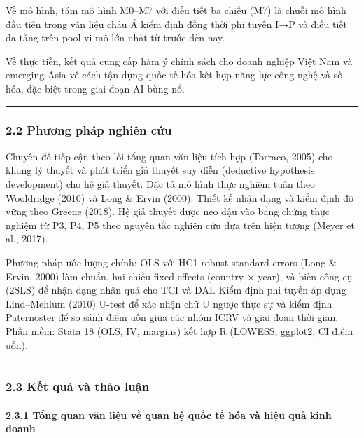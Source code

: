 \documentclass[12pt,a4paper]{article}
\begin{document}
Về mô hình, tám mô hình M0--M7 với điều tiết ba chiều (M7) là chuỗi mô
hình đầu tiên trong văn liệu châu Á kiểm định đồng thời phi tuyến I→P và
điều tiết đa tầng trên pool vi mô lớn nhất từ trước đến nay.

Về thực tiễn, kết quả cung cấp hàm ý chính sách cho doanh nghiệp Việt
Nam và emerging Asia về cách tận dụng quốc tế hóa kết hợp năng lực công
nghệ và số hóa, đặc biệt trong giai đoạn AI bùng nổ.

\begin{center}\rule{0.5\linewidth}{0.5pt}\end{center}

\hypertarget{22-phux1b0ux1a1ng-phuxe1p-nghiuxean-cux1ee9u}{%
\subsubsection{2.2 Phương pháp nghiên
cứu}\label{22-phux1b0ux1a1ng-phuxe1p-nghiuxean-cux1ee9u}}

Chuyên đề tiếp cận theo lối tổng quan văn liệu tích hợp (Torraco, 2005)
cho khung lý thuyết và phát triển giả thuyết suy diễn (deductive
hypothesis development) cho hệ giả thuyết. Đặc tả mô hình thực nghiệm
tuân theo Wooldridge (2010) và Long \& Ervin (2000). Thiết kế nhận dạng
và kiểm định độ vững theo Greene (2018). Hệ giả thuyết được neo đậu vào
bằng chứng thực nghiệm từ P3, P4, P5 theo nguyên tắc nghiên cứu dựa trên
hiện tượng (Meyer et al., 2017).

Phương pháp ước lượng chính: OLS với HC1 robust standard errors (Long \&
Ervin, 2000) làm chuẩn, hai chiều fixed effects (country × year), và
biến công cụ (2SLS) để nhận dạng nhân quả cho TCI và DAI. Kiểm định phi
tuyến áp dụng Lind--Mehlum (2010) U-test để xác nhận chữ U ngược thực sự
và kiểm định Paternoster để so sánh điểm uốn giữa các nhóm ICRV và giai
đoạn thời gian. Phần mềm: Stata 18 (OLS, IV, margins) kết hợp R (LOWESS,
ggplot2, CI điểm uốn).

\begin{center}\rule{0.5\linewidth}{0.5pt}\end{center}

\hypertarget{23-kux1ebft-quux1ea3-vuxe0-thux1ea3o-luux1eadn}{%
\subsubsection{2.3 Kết quả và thảo
luận}\label{23-kux1ebft-quux1ea3-vuxe0-thux1ea3o-luux1eadn}}

\hypertarget{231-tux1ed5ng-quan-vux103n-liux1ec7u-vux1ec1-quan-hux1ec7-quux1ed1c-tux1ebf-huxf3a-vuxe0-hiux1ec7u-quux1ea3-kinh-doanh}{%
\paragraph{2.3.1 Tổng quan văn liệu về quan hệ quốc tế hóa và hiệu quả
kinh
doanh}\label{231-tux1ed5ng-quan-vux103n-liux1ec7u-vux1ec1-quan-hux1ec7-quux1ed1c-tux1ebf-huxf3a-vuxe0-hiux1ec7u-quux1ea3-kinh-doanh}}
\end{document}
